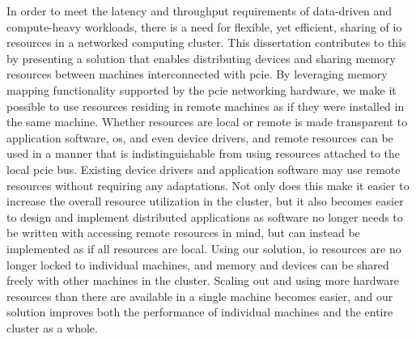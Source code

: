In order to meet the latency and throughput requirements of data-driven and compute-heavy workloads, there is a need for flexible, yet efficient, sharing of \gls{io} resources in a networked computing cluster.
%
This dissertation contributes to this by presenting a solution that enables distributing devices and sharing memory resources between machines interconnected with \gls{pcie}.
%
By leveraging memory mapping functionality supported by the \gls{pcie} networking hardware, we make it possible to use resources residing in remote machines as if they were installed in the same machine.
%
Whether resources are local or remote is made transparent to application software, \gls{os}, and even device drivers, and remote resources can be used in a manner that is indistinguishable from using resources attached to the local \gls{pcie} bus.
%
Existing device drivers and application software may use remote resources without requiring any adaptations.
%
Not only does this make it easier to increase the overall resource utilization in the cluster, but it also becomes easier to design and implement distributed applications as software no longer needs to be written with accessing remote resources in mind,
but can instead be implemented as if all resources are local.
%
Using our solution, \gls{io} resources are no longer locked to individual machines, and memory and devices can be shared freely with other machines in the cluster.
%
Scaling out and using more hardware resources than there are available in a single machine becomes easier, and our solution improves both the performance of individual machines and the entire cluster as a whole.



